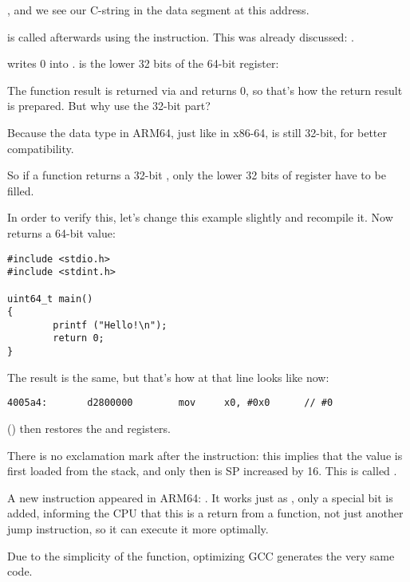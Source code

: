 , and we see our  C-string in the  data segment at this address.


\puts is called afterwards using the  instruction. This was already discussed: .

\MOV writes 0 into . 
 is the lower 32 bits of the 64-bit  register:



The function result is returned via  and \main returns 0, so that's how the return result is prepared.
But why use the 32-bit part?

Because the \Tint data type in ARM64, just like in x86-64, is still 32-bit, for better compatibility.

So if a function returns a 32-bit \Tint, only the lower 32 bits of  register have to be filled.

In order to verify this, let's change this example slightly and recompile it.
Now \main returns a 64-bit value:

\begin{lstlisting}[caption=\main returning a value of \TT{uint64\_t} type]
#include <stdio.h>
#include <stdint.h>

uint64_t main()
{
        printf ("Hello!\n");
        return 0;
}
\end{lstlisting}

The result is the same, but that's how \MOV at that line looks like now:

\begin{lstlisting}[caption=\NonOptimizing GCC 4.8.1 + objdump]
  4005a4:       d2800000        mov     x0, #0x0      // #0
\end{lstlisting}


 () then restores the  and  registers.

There is no exclamation mark after the instruction: this implies that the value is first loaded from the stack,
and only then is \ac{SP} increased by 16.
This is called .

A new instruction appeared in ARM64: \RET. 
It works just as , only a special  bit is added, informing the \ac{CPU}
that this is a return from a function, not just another jump instruction, so it can execute it more optimally.

Due to the simplicity of the function, optimizing GCC generates the very same code.
